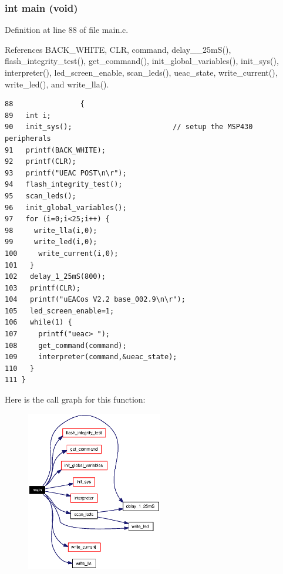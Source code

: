 \subsubsection{\setlength{\rightskip}{0pt plus 5cm}int main (void)}\label{main_8c_a4}




Definition at line 88 of file main.c.

References BACK\_\-WHITE, CLR, command, delay\_\_\-25m\-S(), flash\_\-integrity\_\-test(), get\_\-command(), init\_\-global\_\-variables(), init\_\-sys(), interpreter(), led\_\-screen\_\-enable, scan\_\-leds(), ueac\_\-state, write\_\-current(), write\_\-led(), and write\_\-lla().

\footnotesize\begin{verbatim}88                {
89   int i;
90   init_sys();                        // setup the MSP430 peripherals
91   printf(BACK_WHITE);
92   printf(CLR);
93   printf("UEAC POST\n\r");
94   flash_integrity_test();
95   scan_leds();
96   init_global_variables();
97   for (i=0;i<25;i++) {
98     write_lla(i,0);
99     write_led(i,0);
100     write_current(i,0);
101   }
102   delay_1_25mS(800);     
103   printf(CLR);
104   printf("uEACos V2.2 base_002.9\n\r");
105   led_screen_enable=1;
106   while(1) {
107     printf("ueac> ");
108     get_command(command);
109     interpreter(command,&ueac_state);
110   }
111 }
\end{verbatim}\normalsize 




Here is the call graph for this function:\begin{figure}[H]
\begin{center}
\leavevmode
\includegraphics[width=169pt]{main_8c_a4_cgraph}
\end{center}
\end{figure}
